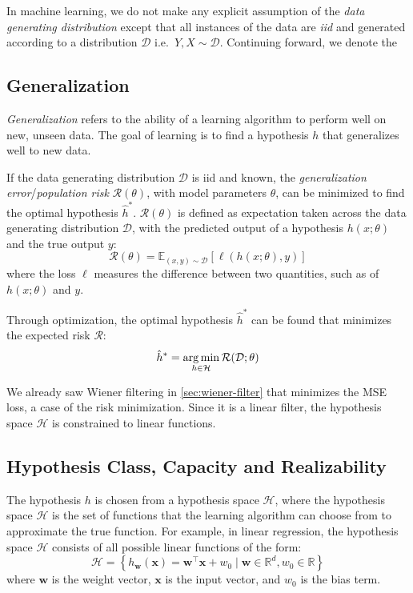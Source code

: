 In machine learning, we do not make any explicit assumption of the \textit{data generating distribution} except that all instances of the data are \textit{\gls{iid}} and generated according to a distribution $\mathcal{D}$ i.e.\ $Y, X \sim \mathcal{D}$. Continuing forward, we denote the

\subsection{Generalization}
\textit{Generalization} refers to the ability of a learning algorithm to perform well on new, unseen data. The goal of learning is to find a hypothesis $h$ that generalizes well to new data. 

If the data generating distribution $\mathcal{D}$ is \gls{iid} and known, the \textit{generalization error}/\textit{population risk} $\mathcal{R}(\theta)$, with model parameters $\theta$, can be minimized to find the optimal hypothesis $\hat{h}^*$. $\mathcal{R}(\theta)$ is defined as expectation taken across the data generating distribution $\mathcal{D}$, with the predicted output of a hypothesis $h(x; \theta)$ and the true output $y$:
\begin{equation}
    \mathcal{R}(\theta) = \mathbb{E}_{(x, y) \sim \mathcal{D}} \left[ \ell(h(x; \theta), y) \right]
\end{equation}
where the loss $\ell$ measures the difference between two quantities, such as of $h(x; \theta)$ and $y$.

Through optimization, the optimal hypothesis $\hat{h}^*$ can be found that minimizes the expected risk $\mathcal{R}$:
\begin{equation}
    \hat{h}^* = \operatorname*{arg\,min}_{h \in \mathcal{H}} \mathcal{R}(\mathcal{D}; \theta)
\end{equation}

We already saw Wiener filtering in \cref{sec:wiener-filter} that minimizes the \gls{MSE} loss, a case of the risk minimization. Since it is a linear filter, the hypothesis space $\mathcal{H}$ is constrained to linear functions.

\subsection{Hypothesis Class, Capacity and Realizability}
The hypothesis $h$ is chosen from a hypothesis space $\mathcal{H}$, where the hypothesis space $\mathcal{H}$ is the set of functions that the learning algorithm can choose from to approximate the true function. 
For example, in linear regression, the hypothesis space $\mathcal{H}$ consists of all possible linear functions of the form:
\begin{equation}\label{eq:linear-hypothesis}
   \mathcal{H} =  \left\{ h_{\mathbf{w}}(\mathbf{x}) = \mathbf{w}^\top \mathbf{x} + w_0 \mid \mathbf{w} \in \mathbb{R}^d, w_0 \in \mathbb{R} \right\}
\end{equation}
where $\mathbf{w}$ is the weight vector, $\mathbf{x}$ is the input vector, and $w_0$ is the bias term.

